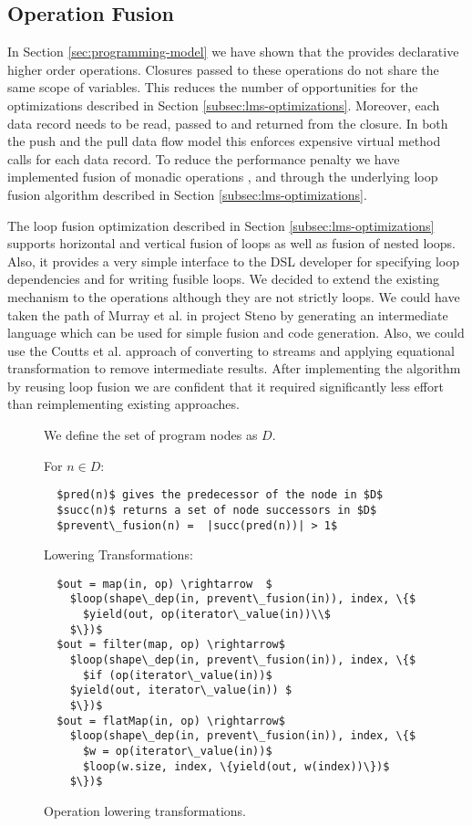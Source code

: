 \subsection{Operation Fusion}
\label{sec:fusion}

In Section \ref{sec:programming-model} we have shown that the  provides declarative higher order operations. Closures passed to these operations do not share the same scope of variables. This reduces the number of opportunities for the optimizations described in Section \ref{subsec:lms-optimizations}. Moreover, each data record needs to be read, passed to and returned from the closure. In both the push and the pull data flow model this enforces expensive virtual method calls \cite{murray_steno:_2011} for each data record. To reduce the performance penalty we have implemented fusion of monadic operations ,  and  through the underlying loop fusion algorithm described in Section \ref{subsec:lms-optimizations}. 

The loop fusion optimization described in Section \ref{subsec:lms-optimizations} supports horizontal and vertical fusion of loops as well as fusion of nested loops. Also, it provides a very simple interface to the DSL developer for specifying loop dependencies and for writing fusible loops. We decided to extend the existing mechanism to the  operations although they are not strictly loops. We could have taken the path of Murray et al. in project Steno \cite{murray_steno:_2011} by generating an intermediate language which can be used for simple fusion and code generation. Also, we could use the Coutts et al. \cite{coutts_stream_2007} approach of converting  to streams and applying equational transformation to remove intermediate results. After implementing the algorithm by reusing loop fusion we are confident that it required significantly less effort than reimplementing existing approaches.

\begin{figure}[t]
We define the set of program  nodes as $D$.

For $n \in D$:
\begin{lstlisting} 
  $pred(n)$ gives the predecessor of the node in $D$
  $succ(n)$ returns a set of node successors in $D$
  $prevent\_fusion(n) =  |succ(pred(n))| > 1$
\end{lstlisting}

Lowering Transformations:
\begin{lstlisting}
  $out = map(in, op) \rightarrow  $
    $loop(shape\_dep(in, prevent\_fusion(in)), index, \{$
      $yield(out, op(iterator\_value(in))\\$
    $\})$
  $out = filter(map, op) \rightarrow$
    $loop(shape\_dep(in, prevent\_fusion(in)), index, \{$
      $if (op(iterator\_value(in))$
	$yield(out, iterator\_value(in)) $
    $\})$
  $out = flatMap(in, op) \rightarrow$
    $loop(shape\_dep(in, prevent\_fusion(in)), index, \{$
      $w = op(iterator\_value(in))$
      $loop(w.size, index, \{yield(out, w(index))\})$
    $\})$
\end{lstlisting}
\caption{Operation lowering transformations.}
\label{lst:lowering}
\end{figure}

